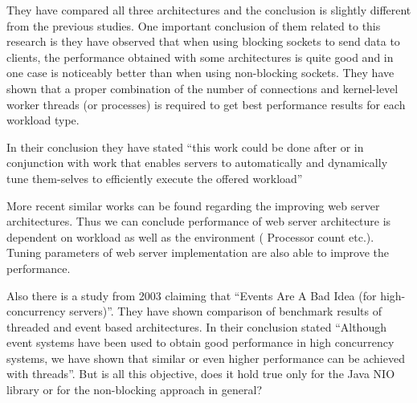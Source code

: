 They have compared all three architectures and the conclusion is slightly different from the previous studies. One important conclusion of them related to this research is they have observed that when using blocking sockets to send data to clients, the performance obtained with some architectures is quite good and in one case is noticeably better than when using non-blocking sockets. They have shown that a proper combination of the number of connections and kernel-level worker threads (or processes) is required to get best performance results for each workload type.

In their conclusion they have stated  “this work could be done after or in conjunction with work that enables servers to automatically and dynamically tune them-selves to efficiently execute the offered workload”

More recent similar works \cite{comparing_high_performance_multi_core,uniproc_multiproc} can be found regarding the improving web server architectures. Thus we can conclude performance of web server architecture is dependent on workload as well as the environment ( Processor count etc.). Tuning parameters of web server implementation are also able to improve the performance.

Also there is a study from 2003 \cite{events_are_bad} claiming that “Events Are A Bad Idea (for high-concurrency servers)”. They have shown comparison of benchmark results of threaded and event based architectures. In their conclusion stated “Although event systems have been used to obtain good performance in high concurrency systems, we have shown that similar or even higher performance can be achieved with threads”. But is all this objective, does it hold true only for the Java \acrshort{NIO} library or for the non-blocking approach in general?









